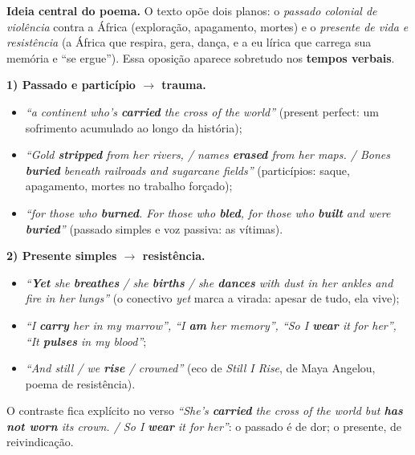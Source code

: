 \documentclass{article}%
\begin{document}
\textbf{Ideia central do poema.} O texto opõe dois planos: o \emph{passado colonial de violência} contra a África (exploração, apagamento, mortes) e o \emph{presente de vida e resistência} (a África que respira, gera, dança, e a eu lírica que carrega sua memória e ``se ergue''). Essa oposição aparece sobretudo nos \textbf{tempos verbais}.

\textbf{1) Passado e particípio $\to$ trauma.}
\begin{itemize}
  \item \textit{``a continent who's \textbf{carried} the cross of the world''} (present perfect: um sofrimento acumulado ao longo da história);
  \item \textit{``Gold \textbf{stripped} from her rivers, / names \textbf{erased} from her maps. / Bones \textbf{buried} beneath railroads and sugarcane fields''} (particípios: saque, apagamento, mortes no trabalho forçado);
  \item \textit{``for those who \textbf{burned}. For those who \textbf{bled}, for those who \textbf{built} and were \textbf{buried}''} (passado simples e voz passiva: as vítimas).
\end{itemize}

\textbf{2) Presente simples $\to$ resistência.}
\begin{itemize}
  \item \textit{``\textbf{Yet} she \textbf{breathes} / she \textbf{births} / she \textbf{dances} with dust in her ankles and fire in her lungs''} (o conectivo \textit{yet} marca a virada: apesar de tudo, ela vive);
  \item \textit{``I \textbf{carry} her in my marrow'', ``I \textbf{am} her memory'', ``So I \textbf{wear} it for her'', ``It \textbf{pulses} in my blood''};
  \item \textit{``And still / we \textbf{rise} / crowned''} (eco de \textit{Still I Rise}, de Maya Angelou, poema de resistência).
\end{itemize}
O contraste fica explícito no verso \textit{``She's \textbf{carried} the cross of the world but \textbf{has not worn} its crown. / So I \textbf{wear} it for her''}: o passado é de dor; o presente, de reivindicação.
\end{document}
